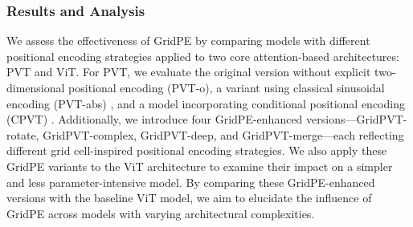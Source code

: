 \documentclass[letterpaper]{article} %
\begin{document}
\subsubsection{Results and Analysis}
We assess the effectiveness of GridPE by comparing models with different positional encoding strategies applied to two core attention-based architectures: PVT and ViT. For PVT, we evaluate the original version without explicit two-dimensional positional encoding (PVT-o), a variant using classical sinusoidal encoding (PVT-abs) \citep{vaswani2017attention}, and a model incorporating conditional positional encoding (CPVT) \citep{chu2023CPVT}. Additionally, we introduce four GridPE-enhanced versions—GridPVT-rotate, GridPVT-complex, GridPVT-deep, and GridPVT-merge—each reflecting different grid cell-inspired positional encoding strategies. We also apply these GridPE variants to the ViT architecture to examine their impact on a simpler and less parameter-intensive model. By comparing these GridPE-enhanced versions with the baseline ViT model, we aim to elucidate the influence of GridPE across models with varying architectural complexities.

\begin{table}[htb]
    \centering
    \caption{Comparative Analysis of Different Position Encoding Methods in Image Classification Tasks}
    \label{tab:model_performance}
\end{table}
\end{document}
